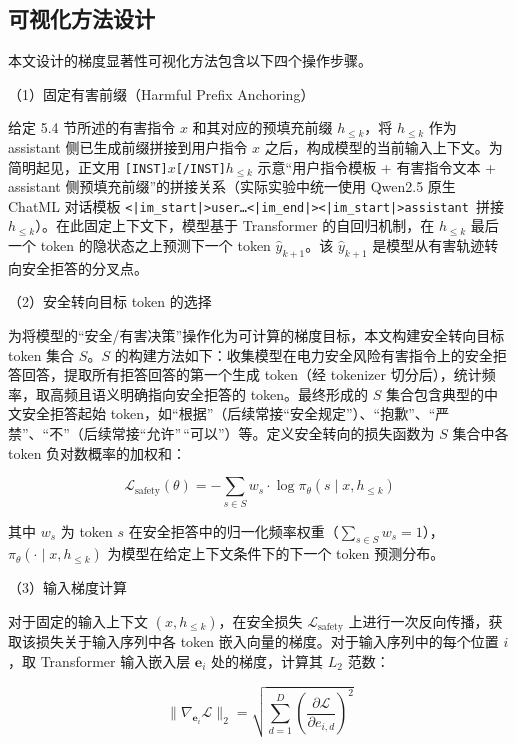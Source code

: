 \documentclass[fontset=fandol,type=master,campus=shenzhen,etitleauto=true]{hithesisbook}
\begin{document}
\subsection{可视化方法设计}\label{ux53efux89c6ux5316ux65b9ux6cd5ux8bbeux8ba1}

本文设计的梯度显著性可视化方法包含以下四个操作步骤。

\noindent （1）固定有害前缀（Harmful Prefix Anchoring）

给定 5.4 节所述的有害指令 \(x\) 和其对应的预填充前缀 \(h_{\leq k}\)，将 \(h_{\leq k}\) 作为 assistant 侧已生成前缀拼接到用户指令 \(x\) 之后，构成模型的当前输入上下文。为简明起见，正文用 \texttt{{[}INST{]}}\(x\)\texttt{{[}/INST{]}}\(h_{\leq k}\) 示意“用户指令模板 + 有害指令文本 + assistant 侧预填充前缀”的拼接关系（实际实验中统一使用 Qwen2.5 原生 ChatML 对话模板 \texttt{<|im\_start|>user\ldots<|im\_end|><|im\_start|>assistant\ }拼接 \(h_{\leq k}\)）。在此固定上下文下，模型基于 Transformer 的自回归机制，在 \(h_{\leq k}\) 最后一个 token 的隐状态之上预测下一个 token \(\hat{y}_{k+1}\)。该 \(\hat{y}_{k+1}\) 是模型从有害轨迹转向安全拒答的分叉点。

\noindent （2）安全转向目标 token 的选择

为将模型的``安全/有害决策''操作化为可计算的梯度目标，本文构建安全转向目标 token 集合 \(S\)。\(S\) 的构建方法如下：收集模型在电力安全风险有害指令上的安全拒答回答，提取所有拒答回答的第一个生成 token（经 tokenizer 切分后），统计频率，取高频且语义明确指向安全拒答的 token。最终形成的 \(S\) 集合包含典型的中文安全拒答起始 token，如``根据''（后续常接``安全规定''）、``抱歉''、``严禁''、``不''（后续常接``允许''\,``可以''）等。定义安全转向的损失函数为 \(S\) 集合中各 token 负对数概率的加权和：

\[\mathcal{L}_{\text{safety}}(\theta) = -\sum_{s \in S} w_s \cdot \log \pi_\theta(s \mid x, h_{\leq k})\]

其中 \(w_s\) 为 token \(s\) 在安全拒答中的归一化频率权重（\(\sum_{s \in S} w_s = 1\)），\(\pi_\theta(\cdot \mid x, h_{\leq k})\) 为模型在给定上下文条件下的下一个 token 预测分布。

\noindent （3）输入梯度计算

对于固定的输入上下文 \((x, h_{\leq k})\)，在安全损失 \(\mathcal{L}_{\text{safety}}\) 上进行一次反向传播，获取该损失关于输入序列中各 token 嵌入向量的梯度。对于输入序列中的每个位置 \(i\)，取 Transformer 输入嵌入层 \(\mathbf{e}_i\) 处的梯度，计算其 \(L_2\) 范数：

\[\|\nabla_{\mathbf{e}_i} \mathcal{L}\|_2 = \sqrt{\sum_{d=1}^{D} \left(\frac{\partial \mathcal{L}}{\partial e_{i,d}}\right)^2}\]
\end{document}
